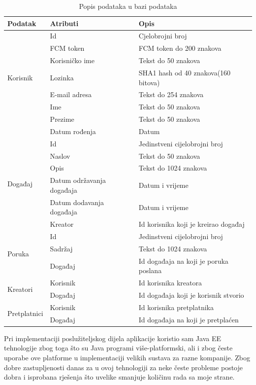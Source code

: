 \documentclass[times, utf8, zavrsni]{fer}
\begin{document}
{\begin{table}[htb]
\caption{Popis podataka u bazi podataka}
\label{tbl:database}
\centering
\begin{tabular}{lll} \hline
Podatak & Atributi & Opis\\ \hline
\multirow{7}{*}{Korisnik}
& Id & Cjelobrojni broj \\
& FCM token & FCM token do 200 znakova \\
& Korisničko ime & Tekst do 50 znakova \\
& Lozinka & SHA1 hash od 40 znakova(160 bitova) \\
& E-mail adresa & Tekst do 254 znakova \\
& Ime & Tekst do 50 znakova \\
& Prezime & Tekst do 50 znakova \\
& Datum rođenja & Datum \\ \hline
\multirow{6}{*}{Događaj}
& Id & Jedinstveni cijelobrojni broj \\
& Naslov & Tekst do 50 znakova \\
& Opis & Tekst do 1024 znakova \\
& Datum održavanja događaja & Datum i vrijeme \\
& Datum dodavanja događaja & Datum i vrijeme \\ 
& Kreator & Id korisnika koji je kreirao događaj \\ \hline
\multirow{3}{*}{Poruka}
& Id & Jedinstveni cijelobrojni broj \\
& Sadržaj & Tekst do 1024 znakova \\
& Događaj & Id događaja na koji je poruka poslana \\ \hline
\multirow{2}{*}{Kreatori}
& Korisnik & Id korisnika kreatora \\
& Događaj & Id događaja koji je korisnik stvorio \\ \hline
\multirow{2}{*}{Pretplatnici}
& Korisnik & Id korisnika pretplatnika \\
& Događaj & Id događaja na koji je pretplaćen \\ \hline
\end{tabular}
\end{table}

Pri implementaciji poslužiteljskog dijela aplikacije koristio sam Java EE tehnologije zbog toga što su Java programi više-platformski, ali i zbog česte uporabe ove platforme u implementaciji velikih sustava za razne kompanije. Zbog dobre zastupljenosti danas za u ovoj tehnologiji za neke česte probleme postoje dobra i isprobana rješenja što uvelike smanjuje količinu rada sa moje strane.

}
\end{document}
